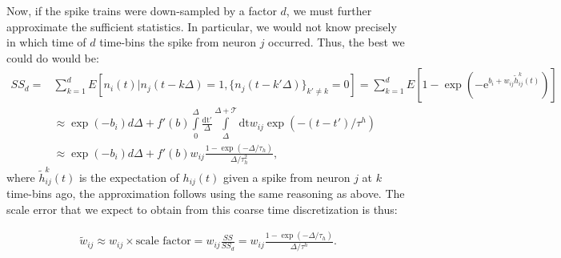 Now, if the spike trains were down-sampled by a factor $d$, we must further approximate the sufficient statistics. In particular, we would not know precisely in which time of $d$ time-bins the spike from neuron $j$ occurred.  Thus, the best we could do would be:
\begin{align} %
SS_d=&\sum_{k=1}^{d} E\left[n_i(t) | n_j(t-k\Delta)=1, \{n_j(t-k'\Delta)\}_{k' \neq k}=0\right] %
=\sum_{k=1}^d E\left[1-\exp\left(-\text{e}^{b_i+w_{ij}\tilde{h}_{ij}^k(t)}\right) \right] \nonumber \\
&\approx \exp(-b_i) d\Delta + f'(b) \int\limits_0^\Delta \frac{\text{dt}'}{\Delta} \int\limits_{\Delta}^{\Delta + \mathcal{T}} \text{dt} w_{ij}\exp(-(t-t')/\tau^h) \nonumber \\&
\approx \exp(-b_i) d\Delta +  f'(b)w_{ij}\frac{1-\exp(-\Delta/\tau_h)}{\Delta/\tau_h^2}, \label{eqn:SS_d}
\end{align}
\noindent where $\tilde{h}_{ij}^k(t)$ is the expectation of $h_{ij}(t)$ given a spike from neuron $j$ at $k$ time-bins ago, the approximation follows using the same reasoning as above. The scale error that we expect to obtain from this coarse time discretization is thus: 

\begin{align} \label{eqn:bias}
	\tilde w_{ij} \approx w_{ij} \times\text{scale factor} = w_{ij}  \frac{SS}{SS_d} = w_{ij} \frac{1-\exp(-\Delta/\tau_h)}{\Delta/\tau^h}.
\end{align}


